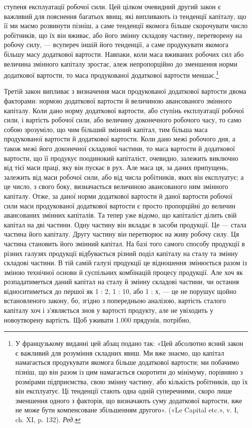 \parcont{}  %
ступеня експлуатації робочої сили. Цей цілком очевидний другий
закон є важливий для пояснення багатьох явищ, які випливають
із тенденції капіталу, що її ми маємо розвинути пізніш,
а саме тенденції якомога більше скорочувати число робітників,
що їх він вживає, або його змінну складову частину, перетворену
на робочу силу, — всупереч іншій його тенденції, а саме продукувати
якомога більшу масу додаткової вартости. Навпаки, коли
маса вживаних робочих сил або величина змінного капіталу
зростає, алеж непропорційно до зменшення норми додаткової
вартости, то маса продукованої додаткової вартости меншає.\footnote*{
У французькому виданні цей абзац подано так: «Цей абсолютно
ясний закон є важливий для розуміння складних явиш. Ми вже знаємо,
що капітал намагається продукувати якомога більше додаткової вартости;
ми побачимо пізніш, що він разом із цим намагається скоротити до
мінімуму, порівняно з розмірами підприємства, свою змінну частину,
або кількість робітників, що їх він експлуатує. Ці тенденції стають одна
одній суперечними, скоро лише зменшення одного з факторів, що визначають
суму додаткової вартости, вже не може бути компенсоване збільшенням
другого». («Le Capital etc.», v. I, ch. XI, p. 132). \emph{Ред.}
}

Третій закон випливає з визначення маси продукованої додаткової
вартости двома факторами: нормою додаткової вартости й
величиною авансованого змінного капіталу. Коли дано норму
додаткової вартости, або ступінь експлуатації робочої сили,
і вартість робочої сили, або величину доконечного робочого
часу, то само собою зрозуміло, що чим більший змінний капітал,
тим більша маса продукованої вартости й додаткової вартости.
Коли дано межі робочого дня, а також межі його доконечної
складової частини, то маса вартости й додаткової вартости,
що її продукує поодинокий капіталіст, очевидно, залежить
виключно від тієї маси праці, яку він пускає в рух. Але
маса ця, за даних припущень, залежить від маси робочої сили,
або від числа робітників, яких він експлуатує; а це число, з
свого боку, визначається величиною авансованого ним змінного
капіталу. Отже, за даної норми додаткової вартости й даної вартости
робочої сили маси продукованої додаткової вартости є
просто пропорційні до величин авансованих змінних капіталів.
Та тепер уже відомо, що капіталіст ділить свій капітал на
дві частини. Одну частину він вкладає в засоби продукції. Це —
стала частина його капіталу. Другу частину він перетворює на
живу робочу силу. Ця частина становить його змінний капітал.
На базі того самого способу продукції в різних галузях продукції
відбувається різний поділ капіталу на сталу та змінну складові
частини. В тій самій галузі продукції це відношення змінюється
разом із зміною технічної основи й суспільних комбінацій процесу
продукції. Але хоч як розпадатиметься даний капітал на сталу
й змінну складові частини, чи остання відноситиметься до першої
як 1 : 2, 1 : 10, або 1 : х, — це не порушує щойно встановленого
закону, бо, згідно з попередньою аналізою, вартість сталого капіталу
хоч і з’являється знов у вартості продукту, але не увіходить
у новоутворену вартість. Щоб уживати 1.000 прядунів, потрібно,
\parbreak{}  %
